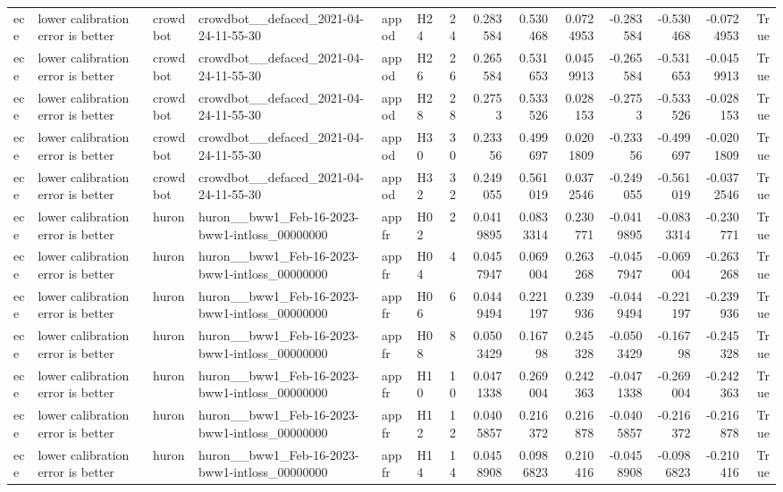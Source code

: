 \begin{longtable}{llllllrrrrrrrr}
ece & lower calibration error is better & crowdbot & crowdbot\_\_defaced\_2021-04-24-11-55-30 & appod & H24 & 24 & 0.283584 & 0.530468 & 0.0724953 & -0.283584 & -0.530468 & -0.0724953 & True \\
ece & lower calibration error is better & crowdbot & crowdbot\_\_defaced\_2021-04-24-11-55-30 & appod & H26 & 26 & 0.265584 & 0.531653 & 0.0459913 & -0.265584 & -0.531653 & -0.0459913 & True \\
ece & lower calibration error is better & crowdbot & crowdbot\_\_defaced\_2021-04-24-11-55-30 & appod & H28 & 28 & 0.2753 & 0.533526 & 0.028153 & -0.2753 & -0.533526 & -0.028153 & True \\
ece & lower calibration error is better & crowdbot & crowdbot\_\_defaced\_2021-04-24-11-55-30 & appod & H30 & 30 & 0.23356 & 0.499697 & 0.0201809 & -0.23356 & -0.499697 & -0.0201809 & True \\
ece & lower calibration error is better & crowdbot & crowdbot\_\_defaced\_2021-04-24-11-55-30 & appod & H32 & 32 & 0.249055 & 0.561019 & 0.0372546 & -0.249055 & -0.561019 & -0.0372546 & True \\
ece & lower calibration error is better & huron & huron\_\_bww1\_Feb-16-2023-bww1-intloss\_00000000 & appfr & H02 & 2 & 0.0419895 & 0.0833314 & 0.230771 & -0.0419895 & -0.0833314 & -0.230771 & True \\
ece & lower calibration error is better & huron & huron\_\_bww1\_Feb-16-2023-bww1-intloss\_00000000 & appfr & H04 & 4 & 0.0457947 & 0.069004 & 0.263268 & -0.0457947 & -0.069004 & -0.263268 & True \\
ece & lower calibration error is better & huron & huron\_\_bww1\_Feb-16-2023-bww1-intloss\_00000000 & appfr & H06 & 6 & 0.0449494 & 0.221197 & 0.239936 & -0.0449494 & -0.221197 & -0.239936 & True \\
ece & lower calibration error is better & huron & huron\_\_bww1\_Feb-16-2023-bww1-intloss\_00000000 & appfr & H08 & 8 & 0.0503429 & 0.16798 & 0.245328 & -0.0503429 & -0.16798 & -0.245328 & True \\
ece & lower calibration error is better & huron & huron\_\_bww1\_Feb-16-2023-bww1-intloss\_00000000 & appfr & H10 & 10 & 0.0471338 & 0.269004 & 0.242363 & -0.0471338 & -0.269004 & -0.242363 & True \\
ece & lower calibration error is better & huron & huron\_\_bww1\_Feb-16-2023-bww1-intloss\_00000000 & appfr & H12 & 12 & 0.0405857 & 0.216372 & 0.216878 & -0.0405857 & -0.216372 & -0.216878 & True \\
ece & lower calibration error is better & huron & huron\_\_bww1\_Feb-16-2023-bww1-intloss\_00000000 & appfr & H14 & 14 & 0.0458908 & 0.0986823 & 0.210416 & -0.0458908 & -0.0986823 & -0.210416 & True \\

\end{longtable}
